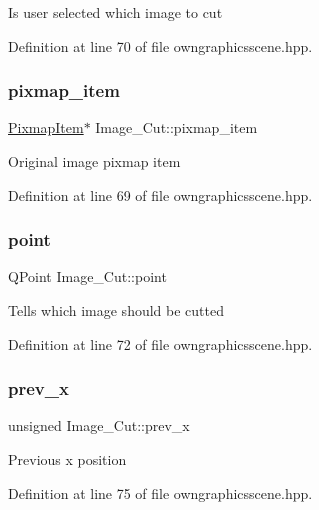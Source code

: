 Is user selected which image to cut 

Definition at line 70 of file owngraphicsscene.\+hpp.

\mbox{\label{structImage__Cut_afdafc46c968b35b63758d409ef863a8f}} 
\subsubsection{\texorpdfstring{pixmap\+\_\+item}{pixmap\_item}}
{\footnotesize\ttfamily \mbox{\hyperlink{classPixmapItem}{Pixmap\+Item}}$\ast$ Image\+\_\+\+Cut\+::pixmap\+\_\+item}

Original image pixmap item 

Definition at line 69 of file owngraphicsscene.\+hpp.

\mbox{\label{structImage__Cut_a45fc996285a5ae8ef255d66655d63df2}} 
\subsubsection{\texorpdfstring{point}{point}}
{\footnotesize\ttfamily Q\+Point Image\+\_\+\+Cut\+::point}

Tells which image should be cutted 

Definition at line 72 of file owngraphicsscene.\+hpp.

\mbox{\label{structImage__Cut_a9e6768e7bea9a60876d086d78da3c4df}} 
\subsubsection{\texorpdfstring{prev\+\_\+x}{prev\_x}}
{\footnotesize\ttfamily unsigned Image\+\_\+\+Cut\+::prev\+\_\+x}

Previous x position 

Definition at line 75 of file owngraphicsscene.\+hpp.

\mbox{\label{structImage__Cut_ad86dabb21b97270448d8db5aa7a5676f}} 
